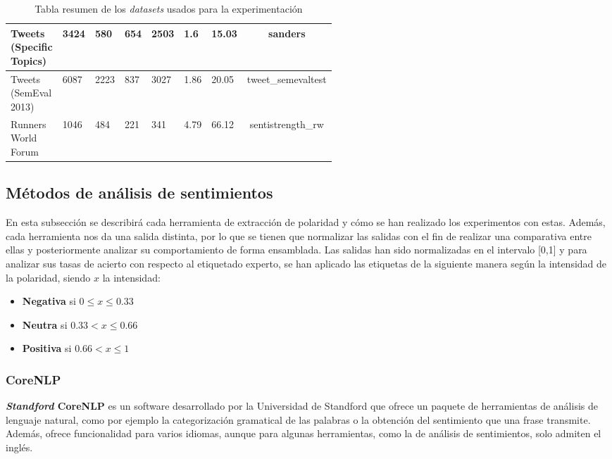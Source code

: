 \begin{table}[H]
{\begin{tabular}{|b{1.8cm}b{1.3cm}b{1.3cm}b{1.3cm}b{1.3cm}b{1.5cm}b{1.9cm}c|}
		\hline 
		\specialcell{Tweets\\(Specific\\Topics)}& 3424  & 580 & 654 & 2503 & 1.6 & 15.03  & sanders   \\ 
		\hline 
		\specialcell{Tweets\\(SemEval\\2013)}& 6087 & 2223 & 837 & 3027 & 1.86 & 20.05  & tweet\_semevaltest    \\ 
		\hline 
		\specialcell{Runners\\World\\Forum}& 1046 & 484 & 221 & 341 & 4.79 & 66.12  & sentistrength\_rw   \\ 
		\hline 
	\end{tabular}
}
	\caption{Tabla resumen de los \textit{datasets} usados para la experimentación}
	\label{tabla_datos}
\end{table}

\subsection{Métodos de análisis de sentimientos} \label{toolsdescription}
En esta subsección se describirá cada herramienta de extracción de polaridad y cómo se han realizado los experimentos con estas. Además, cada herramienta nos da una salida distinta, por lo que se tienen que normalizar las salidas con el fin de realizar una comparativa entre ellas y posteriormente analizar su comportamiento de forma ensamblada. Las salidas han sido normalizadas en el intervalo [0,1] y para analizar sus tasas de acierto con respecto al etiquetado experto, se han aplicado las etiquetas de la siguiente manera según la intensidad de la polaridad, siendo $x$ la intensidad:
\begin{itemize}
	\item \textbf{Negativa} si $0 \leq x \leq 0.33$
	\item \textbf{Neutra} si $0.33 < x \leq 0.66$
	\item \textbf{Positiva} si $0.66 < x \leq 1$
\end{itemize}

\subsubsection{CoreNLP}
 \textbf{\textit{Standford} CoreNLP} \cite{corenlppaper} es un software desarrollado por la Universidad de Standford que ofrece un paquete de herramientas de análisis de lenguaje natural, como por ejemplo la categorización gramatical de las palabras o la obtención del sentimiento que una frase transmite. Además, ofrece funcionalidad para varios idiomas, aunque para algunas herramientas, como la de análisis de sentimientos, solo admiten el inglés.
 
